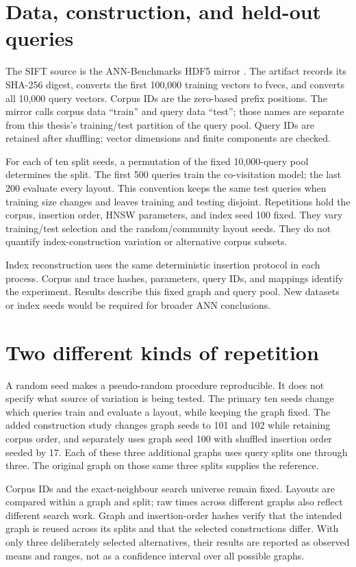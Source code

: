 \documentclass[11pt,a4paper]{report}
\begin{document}
\section{Data, construction, and held-out queries}
The SIFT source is the ANN-Benchmarks HDF5 mirror \cite{annbench,pq}. The artifact records its SHA-256 digest, converts the first 100,000 training vectors to fvecs, and converts all 10,000 query vectors. Corpus IDs are the zero-based prefix positions. The mirror calls corpus data ``train'' and query data ``test''; those names are separate from this thesis's training/test partition of the query pool. Query IDs are retained after shuffling; vector dimensions and finite components are checked.

For each of ten split seeds, a permutation of the fixed 10,000-query pool determines the split. The first 500 queries train the co-visitation model; the last 200 evaluate every layout. This convention keeps the same test queries when training size changes and leaves training and testing disjoint. Repetitions hold the corpus, insertion order, HNSW parameters, and index seed 100 fixed. They vary training/test selection and the random/community layout seeds. They do not quantify index-construction variation or alternative corpus subsets.

Index reconstruction uses the same deterministic insertion protocol in each process. Corpus and trace hashes, parameters, query IDs, and mappings identify the experiment. Results describe this fixed graph and query pool. New datasets or index seeds would be required for broader ANN conclusions.

\section{Two different kinds of repetition}
A random seed makes a pseudo-random procedure reproducible. It does not specify what source of variation is being tested. The primary ten seeds change which queries train and evaluate a layout, while keeping the graph fixed. The added construction study changes graph seeds to 101 and 102 while retaining corpus order, and separately uses graph seed 100 with shuffled insertion order seeded by 17. Each of these three additional graphs uses query splits one through three. The original graph on those same three splits supplies the reference.

Corpus IDs and the exact-neighbour search universe remain fixed. Layouts are compared within a graph and split; raw times across different graphs also reflect different search work. Graph and insertion-order hashes verify that the intended graph is reused across its splits and that the selected constructions differ. With only three deliberately selected alternatives, their results are reported as observed means and ranges, not as a confidence interval over all possible graphs.
\end{document}
